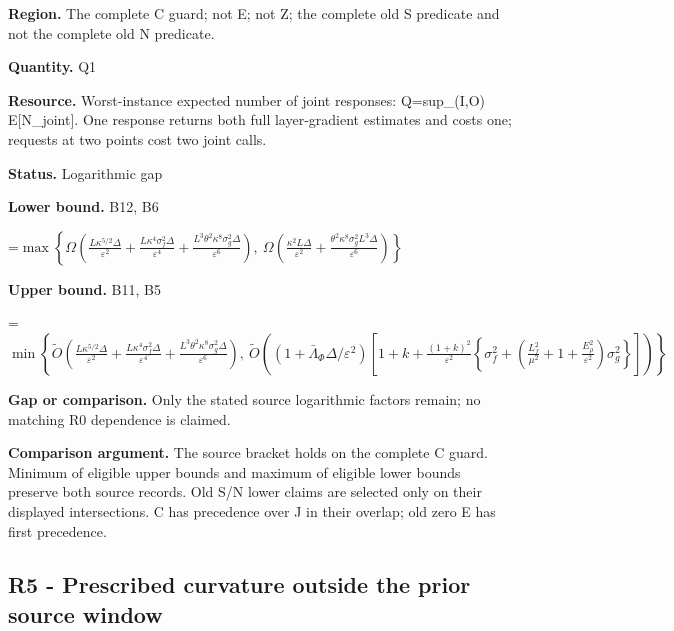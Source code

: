 \documentclass[10pt,a4paper]{article}
\newcommand{\AtlasMath}[1]{\par\begingroup\centering\setbox0=\hbox{$\displaystyle #1$}\ifdim\wd0>1.4\linewidth\typeout{ATLAS WIDE FORMULA: \the\wd0}\fi\ifdim\wd0>\linewidth\resizebox{\linewidth}{!}{\box0}\else\box0\fi\par\endgroup}
\begin{document}
\textbf{Region.} The complete C guard; not E; not Z; the complete old S predicate and not the complete old N predicate.



\textbf{Quantity.} Q1



\textbf{Resource.} Worst-instance expected number of joint responses: Q=sup\_(I,O) E[N\_joint]. One response returns both full layer-gradient estimates and costs one; requests at two points cost two joint calls.



\textbf{Status.} Logarithmic gap



\textbf{Lower bound.} B12, B6



\AtlasMath{\max\left\{\Omega\!\left(\frac{L\kappa^{5/2}\Delta}{\varepsilon^2}+\frac{L\kappa^4\sigma_f^2\Delta}{\varepsilon^4}+\frac{L^3\theta^2\kappa^8\sigma_g^2\Delta}{\varepsilon^6}\right),\ \Omega\!\left(\frac{\kappa^2L\Delta}{\varepsilon^2}+\frac{\theta^2\kappa^8\sigma_g^2L^3\Delta}{\varepsilon^6}\right)\right\}}


\textbf{Upper bound.} B11, B5



\AtlasMath{\min\left\{\widetilde O\!\left(\frac{L\kappa^{5/2}\Delta}{\varepsilon^2}+\frac{L\kappa^4\sigma_f^2\Delta}{\varepsilon^4}+\frac{L^3\theta^2\kappa^8\sigma_g^2\Delta}{\varepsilon^6}\right),\ \widetilde O\!\left((1+\bar\Lambda_\Phi\Delta/\varepsilon^2)\left[1+k+\frac{(1+k)^2}{\varepsilon^2}\left\{\sigma_f^2+\left(\frac{L_f^2}{\mu^2}+1+\frac{E_\rho^2}{\varepsilon^2}\right)\sigma_g^2\right\}\right]\right)\right\}}


\textbf{Gap or comparison.} Only the stated source logarithmic factors remain; no matching R0 dependence is claimed.



\textbf{Comparison argument.} The source bracket holds on the complete C guard. Minimum of eligible upper bounds and maximum of eligible lower bounds preserve both source records. Old S/N lower claims are selected only on their displayed intersections. C has precedence over J in their overlap; old zero E has first precedence.



\subsection{R5 - Prescribed curvature outside the prior source window}
\end{document}
